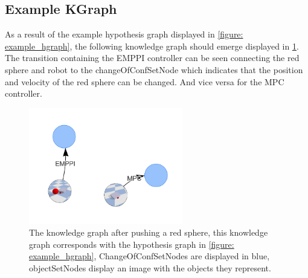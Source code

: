 \subsection{Example KGraph}
As a result of the example hypothesis graph displayed in \cref{figure: example_hgraph}, the following knowledge graph should emerge displayed in \cref{figure: example_kgraph}. The transition containing the \ac{EMPPI} controller can be seen connecting the red sphere and robot to the changeOfConfSetNode which indicates that the position and velocity of the red sphere can be changed. And vice versa for the \ac{MPC} controller. 

\begin{figure}[H]
    \centering
    \includegraphics[width=0.6\textwidth]{figures/example_kgraph.png}
    \caption{The knowledge graph after pushing a red sphere, this knowledge graph corresponds with the hypothesis graph in \cref{figure: example_hgraph}, ChangeOfConfSetNodes are displayed in blue, objectSetNodes display an image with the objects they represent.}
    \label{figure: example_kgraph}
\end{figure}
